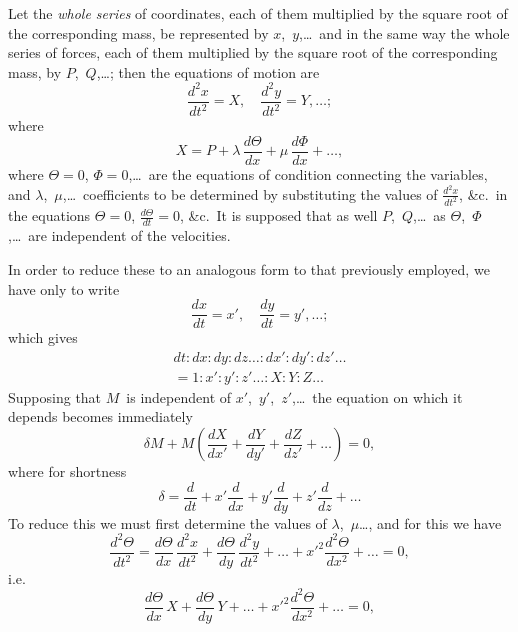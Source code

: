 \documentclass[11pt,a4paper]{article}
\begin{document}
Let the \textit{whole series} of coordinates, each of them multiplied by the square root of the corresponding mass, be represented by $x$,~$y$,\ldots\ and in the same way the whole series of forces, each of them multiplied by the square root of the corresponding mass, by $P$,~$Q$,\ldots; then the equations of motion are
\[
\frac{d^2x}{dt^2} = X, \quad \frac{d^2y}{dt^2} = Y, \ldots;
\]
where
\[
X = P + \lambda\,\frac{d\Theta}{dx} + \mu\,\frac{d\Phi}{dx} + \ldots,
\]
where $\Theta = 0$, $\Phi = 0$,\ldots\ are the equations of condition connecting the variables, and $\lambda$,~$\mu$,\ldots\ coefficients to be determined by substituting the values of $\frac{d^2x}{dt^2}$, \&c.\ in the equations $\Theta = 0$, $\frac{d\Theta}{dt} = 0$, \&c.\ It is supposed that as well $P$,~$Q$,\ldots\ as $\Theta$,~$\Phi$,\ldots\ are independent of the velocities.

\newpage
In order to reduce these to an analogous form to that previously employed, we have only to write
\[
\frac{dx}{dt} = x', \quad \frac{dy}{dt} = y', \ldots;
\]
which gives
\begin{multline*}
dt : dx : dy : dz\ldots : dx' : dy' : dz'\ldots \\
= 1 : x' : y' : z'\ldots : X : Y : Z\ldots
\end{multline*}
Supposing that $M$~is independent of $x'$,~$y'$,~$z'$,\ldots\ the equation on which it depends becomes immediately
\[
\delta M + M\left(\frac{dX}{dx'} + \frac{dY}{dy'} + \frac{dZ}{dz'} + \ldots\right) = 0,
\]
where for shortness
\[
\delta = \frac{d}{dt} + x'\frac{d}{dx} + y'\frac{d}{dy} + z'\frac{d}{dz} + \ldots
\]
To reduce this we must first determine the values of $\lambda$,~$\mu$\ldots, and for this we have
\[
\frac{d^2\Theta}{dt^2} = \frac{d\Theta}{dx}\,\frac{d^2x}{dt^2} + \frac{d\Theta}{dy}\,\frac{d^2y}{dt^2} + \ldots + x'^2\frac{d^2\Theta}{dx^2} + \ldots = 0,
\]
i.e.
\[
\frac{d\Theta}{dx}\,X + \frac{d\Theta}{dy}\,Y + \ldots + x'^2\frac{d^2\Theta}{dx^2} + \ldots = 0,
\]
\end{document}
